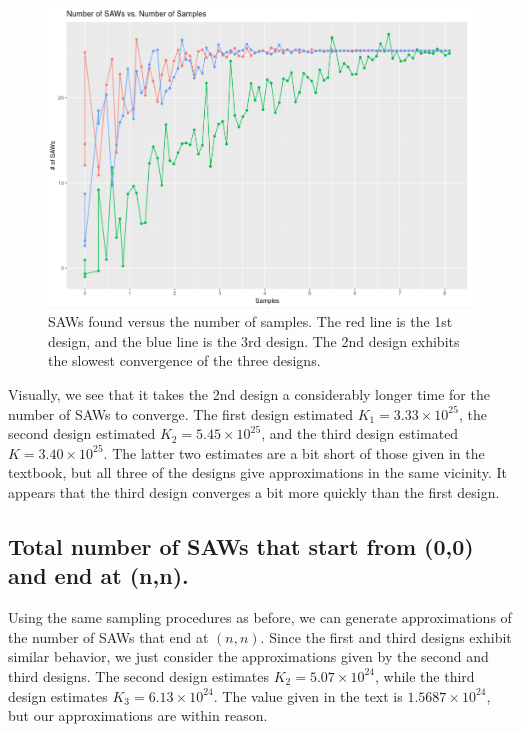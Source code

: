 \documentclass[journal, a4paper]{IEEEtran}
\begin{document}
	\begin{figure}[h]
	\begin{center}
		\includegraphics[width = 1.0\columnwidth]{convergence_plot}
	\end{center}
	\caption{SAWs found versus the number of samples. The red line is the 1st design, and the blue line is the 3rd design. The 2nd design exhibits the slowest convergence of the three designs. \label{fig:convergence}}
	\end{figure}
	
	Visually, we see that it takes the 2nd design a considerably longer time for the number of SAWs to converge. The first design estimated $K_1 = 3.33 \times 10^{25}$, 
	the second design estimated $K_2 = 5.45 \times 10^{25}$, and the third design estimated $K = 3.40 \times 10^{25}$. The latter two estimates are a bit short of those
	given in the textbook, but all three of the designs give approximations in the same vicinity. It appears that the third design converges a bit more quickly than the first design.
	
	\subsection{Total number of SAWs that start from (0,0) and end at (n,n).}
	Using the same sampling procedures as before, we can generate approximations of the number of SAWs that end at $(n,n)$. Since the first and third designs exhibit similar behavior,
	we just consider the approximations given by the second and third designs. The second design estimates $K_2 = 5.07 \times 10^{24}$, 
	while the third design estimates $K_3 = 6.13 \times 10^{24}$. The value given in the text is $1.5687 \times 10^{24}$, but our approximations are within reason.
	
\end{document}
